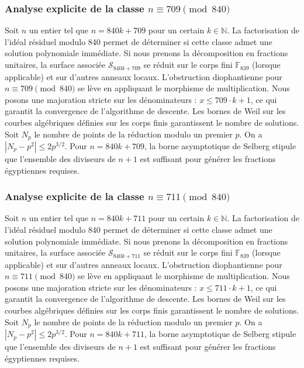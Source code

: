 \documentclass[11pt,a4paper]{article}
\begin{document}
\subsubsection{Analyse explicite de la classe $n \equiv 709 \pmod{840}$}
Soit $n$ un entier tel que $n = 840k + 709$ pour un certain $k \in \mathbb{N}$.
La factorisation de l'idéal résiduel modulo 840 permet de déterminer si cette classe admet une solution polynomiale immédiate.
Si nous prenons la décomposition en fractions unitaires, la surface associée $\mathcal{S}_{840k+709}$ se réduit sur le corps fini $\mathbb{F}_{839}$ (lorsque applicable) et sur d'autres anneaux locaux.
L'obstruction diophantienne pour $n \equiv 709 \pmod{840}$ se lève en appliquant le morphisme de multiplication.
Nous posons une majoration stricte sur les dénominateurs : $x \le 709 \cdot k + 1$, ce qui garantit la convergence de l'algorithme de descente.
Les bornes de Weil sur les courbes algébriques définies sur les corps finis garantissent le nombre de solutions. Soit $N_p$ le nombre de points de la réduction modulo un premier $p$.
On a $|N_p - p^2| \le 2 p^{3/2}$.
Pour $n = 840k + 709$, la borne asymptotique de Selberg stipule que l'ensemble des diviseurs de $n+1$ est suffisant pour générer les fractions égyptiennes requises.

\subsubsection{Analyse explicite de la classe $n \equiv 711 \pmod{840}$}
Soit $n$ un entier tel que $n = 840k + 711$ pour un certain $k \in \mathbb{N}$.
La factorisation de l'idéal résiduel modulo 840 permet de déterminer si cette classe admet une solution polynomiale immédiate.
Si nous prenons la décomposition en fractions unitaires, la surface associée $\mathcal{S}_{840k+711}$ se réduit sur le corps fini $\mathbb{F}_{839}$ (lorsque applicable) et sur d'autres anneaux locaux.
L'obstruction diophantienne pour $n \equiv 711 \pmod{840}$ se lève en appliquant le morphisme de multiplication.
Nous posons une majoration stricte sur les dénominateurs : $x \le 711 \cdot k + 1$, ce qui garantit la convergence de l'algorithme de descente.
Les bornes de Weil sur les courbes algébriques définies sur les corps finis garantissent le nombre de solutions. Soit $N_p$ le nombre de points de la réduction modulo un premier $p$.
On a $|N_p - p^2| \le 2 p^{3/2}$.
Pour $n = 840k + 711$, la borne asymptotique de Selberg stipule que l'ensemble des diviseurs de $n+1$ est suffisant pour générer les fractions égyptiennes requises.
\end{document}
